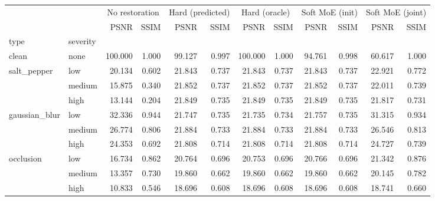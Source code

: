 \begin{tabular}{llrrrrrrrrrr}
\toprule
 &  & \multicolumn{2}{c}{No restoration} & \multicolumn{2}{c}{Hard (predicted)} & \multicolumn{2}{c}{Hard (oracle)} & \multicolumn{2}{c}{Soft MoE (init)} & \multicolumn{2}{c}{Soft MoE (joint)} \\
 &  & PSNR & SSIM & PSNR & SSIM & PSNR & SSIM & PSNR & SSIM & PSNR & SSIM \\
type & severity &  &  &  &  &  &  &  &  &  &  \\
\midrule
clean & none & 100.000 & 1.000 & 99.127 & 0.997 & 100.000 & 1.000 & 94.761 & 0.998 & 60.617 & 1.000 \\
\cline{1-12}
\multirow[t]{3}{*}{salt_pepper} & low & 20.134 & 0.602 & 21.843 & 0.737 & 21.843 & 0.737 & 21.843 & 0.737 & 22.921 & 0.772 \\
 & medium & 15.875 & 0.340 & 21.852 & 0.737 & 21.852 & 0.737 & 21.852 & 0.737 & 22.011 & 0.739 \\
 & high & 13.144 & 0.204 & 21.849 & 0.735 & 21.849 & 0.735 & 21.849 & 0.735 & 21.817 & 0.731 \\
\cline{1-12}
\multirow[t]{3}{*}{gaussian_blur} & low & 32.336 & 0.944 & 21.747 & 0.735 & 21.735 & 0.734 & 21.757 & 0.735 & 31.315 & 0.934 \\
 & medium & 26.774 & 0.806 & 21.884 & 0.733 & 21.884 & 0.733 & 21.884 & 0.733 & 26.546 & 0.813 \\
 & high & 24.353 & 0.692 & 21.808 & 0.714 & 21.808 & 0.714 & 21.808 & 0.714 & 24.727 & 0.739 \\
\cline{1-12}
\multirow[t]{3}{*}{occlusion} & low & 16.734 & 0.862 & 20.764 & 0.696 & 20.753 & 0.696 & 20.766 & 0.696 & 21.342 & 0.876 \\
 & medium & 13.357 & 0.730 & 19.860 & 0.662 & 19.860 & 0.662 & 19.860 & 0.662 & 20.145 & 0.782 \\
 & high & 10.833 & 0.546 & 18.696 & 0.608 & 18.696 & 0.608 & 18.696 & 0.608 & 18.741 & 0.660 \\
\cline{1-12}
\bottomrule
\end{tabular}
